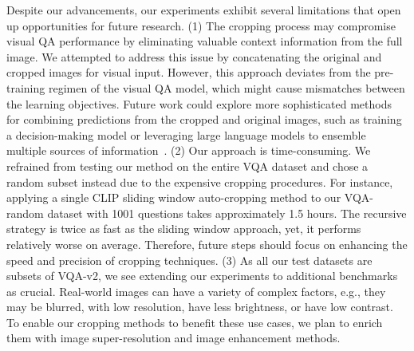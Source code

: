 Despite our advancements, our experiments exhibit several limitations that open up opportunities for future research.
(1) The cropping process may compromise visual QA performance by eliminating valuable context information from the full image. We attempted to address this issue by concatenating the original and cropped images for visual input. However, this approach deviates from the pre-training regimen of the visual QA model, which might cause mismatches between the learning objectives. %
Future work could explore more sophisticated methods for combining predictions from the cropped and original images, such as training a decision-making model or leveraging large language models to ensemble multiple sources of information~\cite{hugginggpt}.
(2) Our approach is time-consuming. We refrained from testing our method on the entire VQA dataset and chose a random subset instead due to the expensive cropping procedures. For instance, applying a single CLIP sliding window auto-cropping method to our VQA-random dataset with 1001 questions takes approximately 1.5 hours. The recursive strategy is twice as fast as the sliding window approach, yet, it performs relatively worse on average. Therefore, future steps should focus on enhancing the speed and precision of cropping techniques. 
(3) As all our test datasets are subsets of VQA-v2, we see extending our experiments to additional benchmarks as crucial. Real-world images can have a variety of complex factors, e.g., they may be blurred, with low resolution, have less brightness, or have low contrast. To enable our cropping methods to benefit these use cases, we plan to enrich them with image super-resolution and image enhancement methods.%
